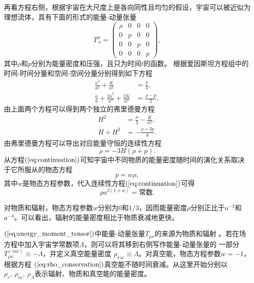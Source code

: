 再看方程右侧，根据宇宙在大尺度上是各向同性且均匀的假设，宇宙可以被近似为理想流体，具有下面的形式的能量-动量张量
\begin{equation}
    \label{eq:energy_moment_tensor}
    T^{\mu}_{\ \nu} =
    \begin{pmatrix}
        \rho & 0 & 0 & 0 \\
        0 & p & 0 & 0 \\
        0 & 0 & p & 0 \\
        0 & 0 & 0 & p
    \end{pmatrix},
\end{equation}
其中$\rho$和$p$分别为能量密度和压强，且只为时间$t$的函数。
根据爱因斯坦方程组中的时间-时间分量和空间-空间分量分别得到如下方程
\begin{align}
    \label{eq:00_einstein} 
    \frac{\dot{a}^2}{a^2} + \frac{K}{a^2} &= \frac{\rho}{3} , \\
    \label{eq:ij_einstein}
    \frac{\ddot{a}}{a}+\frac{2\dot{a}^2}{a^2}+\frac{2K}{a^2}&=
    \frac{\rho-p}{2},
\end{align}
由上面两个方程可以得到两个独立的弗里德曼方程
\begin{align}
    \label{eq:1st_friedmann_equation}
    H^2 &= \frac{\rho}{3}-
    \frac{K}{a^2}, \\
    \label{eq:accelaration_equation}
    \dot{H} + H^2 &= -\frac{\rho+3p}{6}.
\end{align}
由弗里德曼方程可以导出对应能量守恒的连续性方程
\begin{equation}\label{eq:continuation}
    \dot{\rho}=-3H\left(\rho+p\right).
\end{equation}
从方程$(\ref{eq:continuation})$可知宇宙中不同物质的能量密度随时间的演化关系取决于它所服从的物态方程
\begin{equation}
    \label{eq:state_equation}
    p=w\rho,
\end{equation}
其中$w$是物态方程参数，代入连续性方程$(\ref{eq:continuation})$可得
\begin{equation}
    \label{eq:rho_conservation}
    \rho a^{3(1+w)} =\text{常数}.
\end{equation}

对物质和辐射，物态方程参数$w$分别为$0$和$1/3$，因而能量密度$\rho$分别正比于$a^{-3}$和$a^{-4}$。可以看出，辐射的能量密度相比于物质衰减地更快。

$(\ref{eq:energy_moment_tensor})$中能量-动量张量$T_{\mu\nu}$的来源为物质和辐射
。若在场方程中加入宇宙学常数项$\Lambda$，则可以将其移到右侧写作能量-动量张量的
一部分$T^{(vac)}_{\mu\nu}\equiv-\Lambda$，并定义真空能量密度
$\rho_{\text{vac}}\equiv\Lambda$。对真空能，物态方程参数$w=-1$，根据方程
$(\ref{eq:rho_conservation})$真空能不随时间衰减。从这里开始分别以$\rho_r,\
\rho_m,\ \rho_{\Lambda}$表示辐射、物质和真空能的能量密度。

